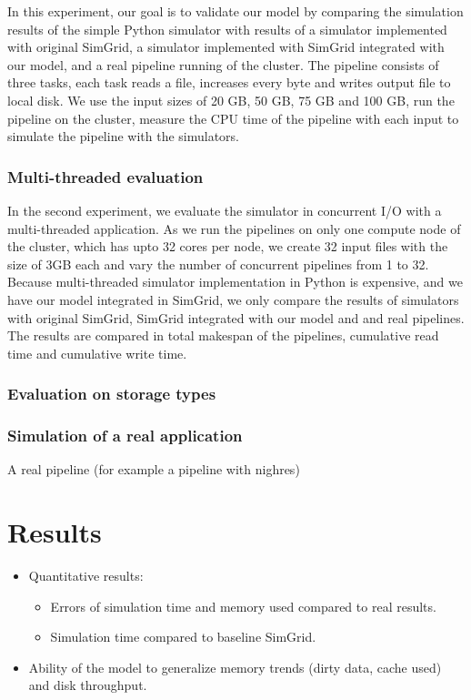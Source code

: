 \documentclass[conference]{IEEEtran}
\begin{document}
				In this experiment, our goal is to validate our model by comparing 
				the simulation results of the simple Python simulator with results of 
				a simulator implemented with original SimGrid, a simulator 
				implemented with SimGrid integrated with our model, and a real pipeline 
				running of the cluster. 
				The pipeline consists of three tasks, each task reads a file, 
				increases every byte and writes output file to local disk. 
				We use the input sizes of 20 GB, 50 GB, 75 GB and 100 GB, run 
				the pipeline on the cluster, measure the CPU time of the pipeline 
				with each input to simulate the pipeline with the simulators.

			\subsubsection{Multi-threaded evaluation}

				In the second experiment, we evaluate the simulator in concurrent I/O 
				with a multi-threaded application. As we run the pipelines on 
				only one compute node of the cluster, which has upto 32 cores per node,  
				we create 32 input files with the size of 3GB each and vary the number of 
				concurrent pipelines from 1 to 32. 
				Because multi-threaded simulator implementation in Python is 
				expensive, and we have our model integrated in SimGrid, 
				we only compare the results of simulators with original SimGrid, 
				SimGrid integrated with our model and and real pipelines. 
				The results are compared in total makespan of the pipelines, 
				cumulative read time and cumulative write time.
			
			\subsubsection{Evaluation on storage types}

				

			\subsubsection{Simulation of a real application}
				A real pipeline (for example a pipeline with nighres)

	\section{Results}
	
		\begin{itemize}

			\item Quantitative results: 
				\begin{itemize}
					\item Errors of simulation time and memory used compared to real results.
					\item Simulation time compared to baseline SimGrid.
				\end{itemize} 

			\item Ability of the model to generalize memory trends (dirty data, cache used) and disk throughput.

		\end{itemize}
\end{document}
